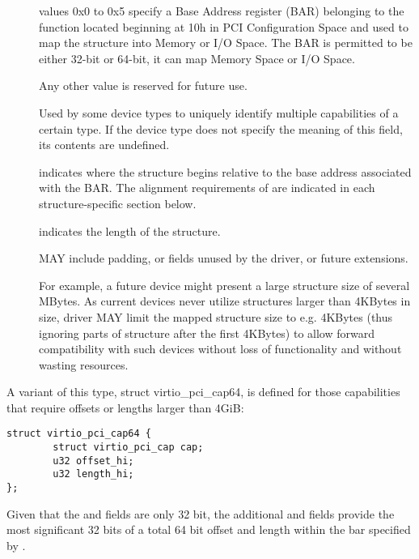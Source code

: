 \begin{description}
\item[]
        values 0x0 to 0x5 specify a Base Address register (BAR) belonging to
        the function located beginning at 10h in PCI Configuration Space
        and used to map the structure into Memory or I/O Space.
        The BAR is permitted to be either 32-bit or 64-bit, it can map Memory Space
        or I/O Space.

        Any other value is reserved for future use.

\item[]
        Used by some device types to uniquely identify multiple capabilities
        of a certain type. If the device type does not specify the meaning of
        this field, its contents are undefined.


\item[]
        indicates where the structure begins relative to the base address associated
        with the BAR.  The alignment requirements of  are indicated
        in each structure-specific section below.

\item[]
        indicates the length of the structure.

         MAY include padding, or fields unused by the driver, or
        future extensions.

        \begin{note}
        For example, a future device might present a large structure size of several
        MBytes.
        As current devices never utilize structures larger than 4KBytes in size,
        driver MAY limit the mapped structure size to e.g.
        4KBytes (thus ignoring parts of structure after the first
        4KBytes) to allow forward compatibility with such devices without loss of
        functionality and without wasting resources.
        \end{note}
\end{description}

A variant of this type, struct virtio_pci_cap64, is defined for
those capabilities that require offsets or lengths larger than
4GiB:

\begin{lstlisting}
struct virtio_pci_cap64 {
        struct virtio_pci_cap cap;
        u32 offset_hi;
        u32 length_hi;
};
\end{lstlisting}

Given that the  and  fields
are only 32 bit, the additional  and 
fields provide the most significant 32 bits of a total 64 bit offset and
length within the bar specified by .

